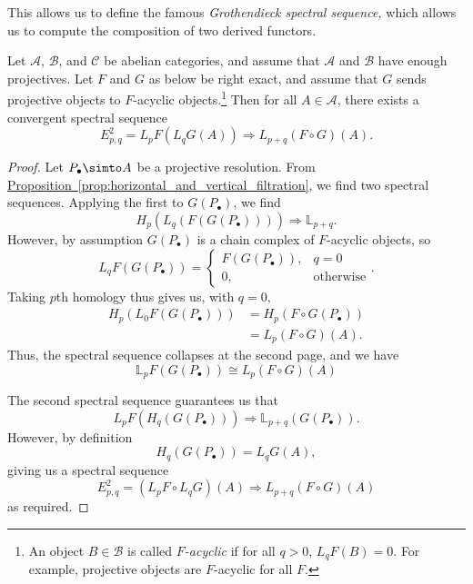 \documentclass[main.tex]{subfiles}
\begin{document}
This allows us to define the famous \emph{Grothendieck spectral sequence,} which allows us to compute the composition of two derived functors.

\begin{proposition}
  \label{prop:grothendieck_spectral_sequence}
  Let $\mathcal{A}$, $\mathcal{B}$, and $\mathcal{C}$ be abelian categories, and assume that $\mathcal{A}$ and $\mathcal{B}$ have enough projectives. Let $F$ and $G$ as below be right exact, and assume that $G$ sends projective objects to $F$-acyclic objects.\footnote{An object $B \in \mathcal{B}$ is called \emph{$F$-acyclic} if for all $q > 0$, $L_{q}F(B) = 0$. For example, projective objects are $F$-acyclic for all $F$.} Then for all $A \in \mathcal{A}$, there exists a convergent spectral sequence
  \begin{equation*}
    E^{2}_{p, q} = L_{p}F(L_{q}G(A)) \Longrightarrow L_{p+q}(F \circ G)(A).
  \end{equation*}
\end{proposition}
\begin{proof}
  Let $P_{\bullet} \simto A$ be a projective resolution. From \hyperref[prop:horizontal_and_vertical_filtration]{Proposition~\ref*{prop:horizontal_and_vertical_filtration}}, we find two spectral sequences. Applying the first to $G(P_{\bullet})$, we find
  \begin{equation*}
    H_{p}(L_{q}(F(G(P_{\bullet})))) \Longrightarrow \mathbb{L}_{p+q}.
  \end{equation*}
  However, by assumption $G(P_{\bullet})$ is a chain complex of $F$-acyclic objects, so
  \begin{equation*}
    L_{q}F(G(P_{\bullet})) =
    \begin{cases}
      F(G(P_{\bullet})), & q = 0 \\
      0, &\text{otherwise}
    \end{cases}.
  \end{equation*}
  Taking $p$th homology thus gives us, with $q = 0$,
  \begin{align*}
    H_{p}(L_{0}F(G(P_{\bullet}))) &= H_{p}(F \circ G(P_{\bullet})) \\
    &= L_{p}(F \circ G)(A).
  \end{align*}
  Thus, the spectral sequence collapses at the second page, and we have
  \begin{equation*}
    \mathbb{L}_{p}F(G(P_{\bullet})) \cong L_{p}(F \circ G)(A)
  \end{equation*}

  The second spectral sequence guarantees us that
  \begin{equation*}
    L_{p}F(H_{q}(G(P_{\bullet}))) \Longrightarrow \mathbb{L}_{p+q}(G(P_{\bullet})).
  \end{equation*}
  However, by definition
  \begin{equation*}
    H_{q}(G(P_{\bullet})) = L_{q}G(A),
  \end{equation*}
  giving us a spectral sequence
  \begin{equation*}
    E^{2}_{p,q} = (L_{p}F \circ L_{q}G)(A) \Longrightarrow L_{p+q}(F \circ G)(A)
  \end{equation*}
  as required.
\end{proof}
\end{document}
